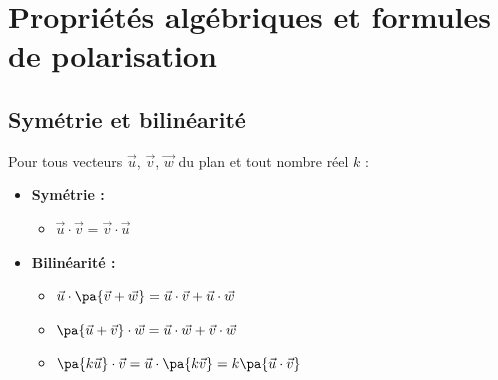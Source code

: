 \newpage

\section{Propriétés algébriques et formules de polarisation}

\subsection{Symétrie et bilinéarité}

\begin{propriete}
	Pour tous vecteurs $\vec{u}$, $\vec{v}$, $\vec{w}$ du plan et tout nombre réel $k$ :
	\begin{itemize}
		\item \textbf{Symétrie :}
		      \begin{itemize}[itemsep=2mm]
			      \item $\vec{u} \cdot \vec{v} = \vec{v} \cdot \vec{u}$
		      \end{itemize}
		\item \textbf{Bilinéarité :}
		      \begin{itemize}[itemsep=2mm]
			      \item $\vec{u} \cdot \pa{\vec{v} + \vec{w}} = \vec{u} \cdot \vec{v} + \vec{u} \cdot \vec{w}$
			      \item $\pa{\vec{u} + \vec{v}} \cdot \vec{w} = \vec{u} \cdot \vec{w} + \vec{v} \cdot \vec{w}$
			      \item $\pa{k\vec{u}} \cdot \vec{v} = \vec{u} \cdot \pa{k\vec{v}} = k\pa{\vec{u} \cdot \vec{v}}$
		      \end{itemize}
	\end{itemize}
\end{propriete}

